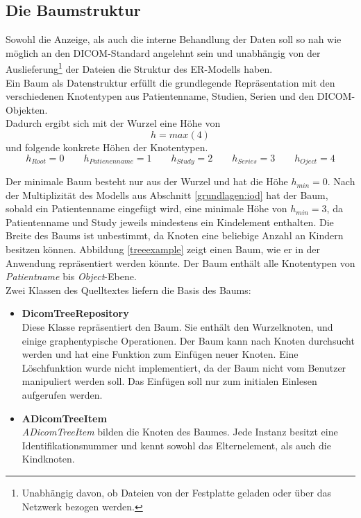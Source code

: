 \subsection{Die Baumstruktur} \label{treestructure}
Sowohl die Anzeige, als auch die interne Behandlung der Daten soll so nah wie möglich an den DICOM-Standard angelehnt sein und unabhängig von der Auslieferung\footnote{Unabhängig davon, ob Dateien von der Festplatte geladen oder über das Netzwerk bezogen werden.} der Dateien die Struktur des ER-Modells haben.\\
Ein Baum als Datenstruktur erfüllt die grundlegende Repräsentation mit den verschiedenen Knotentypen aus Patientenname, Studien, Serien und den DICOM-Objekten.\\
Dadurch ergibt sich mit der Wurzel eine Höhe von
\begin{equation}
h = max(4)
\label{baumheight}
\end{equation}
und folgende konkrete Höhen der Knotentypen.
\begin{equation}
h_{Root} = 0 \qquad
h_{Patienenname} = 1 \qquad 
h_{Study} = 2 \qquad
h_{Series} = 3 \qquad
h_{Oject} = 4
\label{heights}
\end{equation}

Der minimale Baum besteht nur aus der Wurzel und hat die Höhe $h_{min} = 0$. Nach der Multiplizität des Modells aus Abschnitt \ref{grundlagen:iod} hat der Baum, sobald ein Patientenname eingefügt wird, eine minimale Höhe von $h_{min} = 3$, da Patientenname und Study jeweils mindestens ein Kindelement enthalten. Die Breite des Baums ist unbestimmt, da Knoten eine beliebige Anzahl an Kindern besitzen können. Abbildung \ref{treeexample} zeigt einen Baum, wie er in der Anwendung repräsentiert werden könnte. Der Baum enthält alle Knotentypen von \textit{Patientname} bis \textit{Object}-Ebene.\\
Zwei Klassen des Quelltextes liefern die Basis des Baums:

\begin{itemize}
\item \textbf{DicomTreeRepository}\\
	  Diese Klasse repräsentiert den Baum. Sie enthält den Wurzelknoten, und einige graphentypische Operationen. Der Baum kann nach Knoten durchsucht werden und hat eine Funktion zum Einfügen neuer Knoten. Eine Löschfunktion wurde nicht implementiert, da der Baum nicht vom Benutzer manipuliert werden soll. Das Einfügen soll nur zum initialen Einlesen aufgerufen werden.
\item \textbf{ADicomTreeItem}\\
	  \textit{ADicomTreeItem} bilden die Knoten des Baumes. Jede Instanz besitzt eine Identifikationsnummer und kennt sowohl das Elternelement, als auch die Kindknoten. 
\end{itemize}


